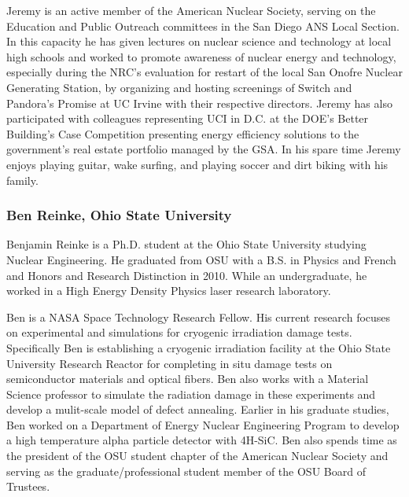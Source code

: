 Jeremy is an active member of the American Nuclear Society, serving on the
Education and Public Outreach committees in the San Diego ANS Local Section. In
this capacity he has given lectures on nuclear science and technology at local
high schools and worked to promote awareness of nuclear energy and technology,
especially during the NRC's evaluation for restart of the local San Onofre
Nuclear Generating Station, by organizing and hosting screenings of Switch and
Pandora's Promise at UC Irvine with their respective directors. Jeremy has also
participated with colleagues representing UCI in D.C. at the DOE's Better
Building's Case Competition presenting energy efficiency solutions to the
government's real estate portfolio managed by the GSA. In his spare time Jeremy
enjoys playing guitar, wake surfing, and playing soccer and dirt biking with his
family.

\subsubsection*{Ben Reinke, Ohio State University}

Benjamin Reinke is a Ph.D. student at the Ohio State University studying Nuclear
Engineering. He graduated from OSU with a B.S. in Physics and French and Honors
and Research Distinction in 2010. While an undergraduate, he worked in a High
Energy Density Physics laser research laboratory.

Ben is a NASA Space Technology Research Fellow. His current research focuses on
experimental and simulations for cryogenic irradiation damage
tests. Specifically Ben is establishing a cryogenic irradiation facility at the
Ohio State University Research Reactor for completing in situ damage tests on
semiconductor materials and optical fibers. Ben also works with a Material
Science professor to simulate the radiation damage in these experiments and
develop a mulit-scale model of defect annealing. Earlier in his graduate
studies, Ben worked on a Department of Energy Nuclear Engineering Program to
develop a high temperature alpha particle detector with 4H-SiC. Ben also spends
time as the president of the OSU student chapter of the American Nuclear Society
and serving as the graduate/professional student member of the OSU Board of
Trustees.

